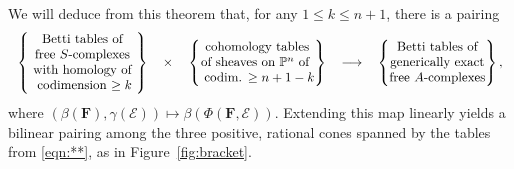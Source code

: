 \documentclass[12pt]{amsart}
\theoremstyle{definition}
\theoremstyle{remark}
\newcommand{\PP}{\mathbb{P}}
\newcommand{\cE}{\mathcal{E}}
\newcommand{\FF}{\mathbf{F}}
\begin{document}
\noindent 
We will deduce from this theorem that, for any $1\leq k\leq n+1$, there is a pairing
 \begin{equation}%
\label{eqn:**}
\begin{tabular}{c c c c c}
$\left\{\begin{matrix}
\text{Betti tables of} \\ \text{free $S$-complexes}\\
\text{ with homology of }\\ \text{ codimension $\geq k$}
\end{matrix}\right\}$
&
$\times$
&
$\left\{\begin{matrix}
\text{cohomology tables}\\
\text{of sheaves on } \PP^n \text { of }\\
\text{ codim. $\geq n+1-k$}
\end{matrix}\right\}$
&
$\longrightarrow$
&
$\left\{\begin{matrix}
\text{Betti tables of} \\
\text{generically exact}\\
 \text{free $A$-complexes}\\
\end{matrix}\right\},$
\end{tabular}
\end{equation}
where $(\beta(\FF),\gamma(\cE))\mapsto \beta(\Phi(\FF,\cE))$.  Extending this map linearly yields a bilinear pairing among the three positive, rational cones spanned by the tables from \eqref{eqn:**}, as  in Figure~\ref{fig:bracket}. 
\end{document}
